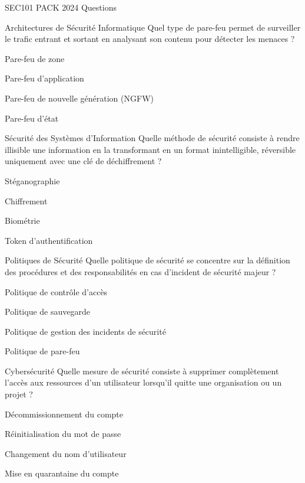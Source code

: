 \documentclass[12pt]{article}
\begin{document}
\begin{quiz}{SEC101 PACK 2024 Questions}
  \begin{multi}[points=1]{Architectures de Sécurité Informatique}
    Quel type de pare-feu permet de surveiller le trafic entrant et sortant en analysant son contenu pour détecter les menaces ?
    \item Pare-feu de zone
    \item Pare-feu d'application
    \item* Pare-feu de nouvelle génération (NGFW)
    \item Pare-feu d'état
  \end{multi}

  \begin{multi}[points=1]{Sécurité des Systèmes d'Information}
    Quelle méthode de sécurité consiste à rendre illisible une information en la transformant en un format inintelligible, réversible uniquement avec une clé de déchiffrement ?
    \item Stéganographie
    \item* Chiffrement
    \item Biométrie
    \item Token d'authentification
  \end{multi}

  \begin{multi}[points=1]{Politiques de Sécurité}
    Quelle politique de sécurité se concentre sur la définition des procédures et des responsabilités en cas d'incident de sécurité majeur ?
    \item Politique de contrôle d'accès
    \item Politique de sauvegarde
    \item* Politique de gestion des incidents de sécurité
    \item Politique de pare-feu
  \end{multi}


  \begin{multi}[points=1]{Cybersécurité}
    Quelle mesure de sécurité consiste à supprimer complètement l'accès aux ressources d'un utilisateur lorsqu'il quitte une organisation ou un projet ?
    \item* Décommissionnement du compte
    \item Réinitialisation du mot de passe
    \item Changement du nom d'utilisateur
    \item Mise en quarantaine du compte
  \end{multi}


\end{quiz}
\end{document}
